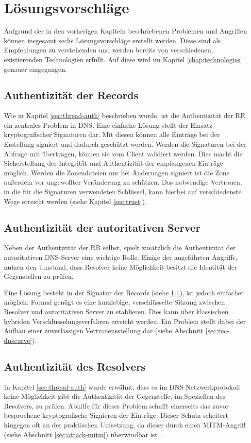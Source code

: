 \chapter{Lösungsvorschläge}
\label{chap:solutions}
Aufgrund der in den vorherigen Kapiteln beschriebenen Problemen und Angriffen können insgesamt sechs Lösungsvorschläge erstellt werden. Diese sind als Empfehlungen zu verstehenden und werden bereits von verschiedenen, existierenden Technologien erfüllt. Auf diese wird im Kapitel \ref{chap:technologies} genauer eingegangen.

\section{Authentizität der Records}
\label{sec:solution-recordauth}
Wie in Kapitel \ref{sec:thread-auth} beschrieben wurde, ist die Authentizität der \ac{RR} ein zentrales Problem in DNS. Eine einfache Lösung stellt der Einsatz kryptografischer Signaturen dar. Mit diesen können alle Einträge bei der Erstellung signiert und dadurch geschützt werden. Werden die Signaturen bei der Abfrage mit übertragen, können sie vom Client validiert werden. Dies macht die Sicherstellung der Integrität und Authentizität der empfangenen Einträge möglich. Werden die Zonendateien nur bei Änderungen signiert ist die Zone außerdem vor ungewollter Veränderung zu schützen. Das notwendige Vertrauen, in die für die Signaturen verwendeten Schlüssel, kann hierbei auf verschiedenste Wege erreicht werden (siehe Kapitel \ref{sec:trust}).

\section{Authentizität der autoritativen Server}
Neben der Authentizität der RR selbst, spielt zusätzlich die Authentizität der autoritativen DNS-Server eine wichtige Rolle. Einige der angeführten Angriffe, nutzen den Umstand, dass Resolver keine Möglichkeit besitzt die Identität der Gegenstellen zu prüfen. 

Eine Lösung besteht in der Signatur der Records (siehe \ref{sec:solution-recordauth}), ist jedoch einfacher möglich: Formal genügt es eine kurzlebige, verschlüsselte Sitzung zwischen Resolver und autoritativen Server zu etablieren. Dies kann über klassischen hybriden Verschlüsselungsverfahren erreicht werden. Ein Problem stellt dabei der Aufbau einer zuverlässigen Vertrauensstellung dar (siehe Abschnitt \ref{sec:tec-dnscurve}).

\section{Authentizität des Resolvers}
In Kapitel \ref{sec:thread-auth} wurde erwähnt, dass es im DNS-Netzwerkprotokoll keine Möglichkeit gibt die Authentizität der Gegenstelle, im Speziellen des Resolvers, zu prüfen. Abhilfe für dieses Problem schafft einerseits das zuvor besprochene kryptografische Signieren der Einträge. Dieser Schutz scheitert hingegen oft an der praktischen Umsetzung, da dieser durch einen MITM-Angriff (siehe Abschnitt \ref{sec:attack-mitm}) überwindbar ist \cite{Bau2010}. 

